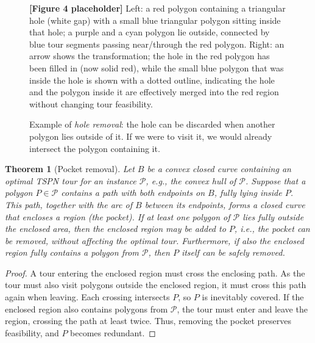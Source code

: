 \documentclass[11pt,a4paper]{article}
\theoremstyle{plain}
\newtheorem{theorem}{Theorem}
\begin{document}
\begin{figure}[h]
\centering
\begin{figplaceholder}
\textbf{[Figure 4 placeholder]} Left: a red polygon containing a triangular hole (white gap) with a small blue triangular polygon sitting inside that hole; a purple and a cyan polygon lie outside, connected by blue tour segments passing near/through the red polygon. Right: an arrow shows the transformation; the hole in the red polygon has been filled in (now solid red), while the small blue polygon that was inside the hole is shown with a dotted outline, indicating the hole and the polygon inside it are effectively merged into the red region without changing tour feasibility.
\end{figplaceholder}
\caption{Example of \emph{hole removal}: the hole can be discarded when another polygon lies outside of it. If we were to visit it, we would already intersect the polygon containing it.}
\label{fig:4}
\end{figure}

\begin{theorem}[Pocket removal]
Let $B$ be a convex closed curve containing an optimal TSPN tour for an instance $\mathcal{P}$, e.g., the convex hull of $\mathcal{P}$. Suppose that a polygon $P \in \mathcal{P}$ contains a path with both endpoints on $B$, fully lying inside $P$. This path, together with the arc of $B$ between its endpoints, forms a closed curve that encloses a region (the \emph{pocket}). If at least one polygon of $\mathcal{P}$ lies fully outside the enclosed area, then the enclosed region may be added to $P$, i.e., the pocket can be removed, without affecting the optimal tour. Furthermore, if also the enclosed region fully contains a polygon from $\mathcal{P}$, then $P$ itself can be safely removed.
\end{theorem}

\begin{proof}
A tour entering the enclosed region must cross the enclosing path. As the tour must also visit polygons outside the enclosed region, it must cross this path again when leaving. Each crossing intersects $P$, so $P$ is inevitably covered. If the enclosed region also contains polygons from $\mathcal{P}$, the tour must enter and leave the region, crossing the path at least twice. Thus, removing the pocket preserves feasibility, and $P$ becomes redundant.
\end{proof}
\end{document}
